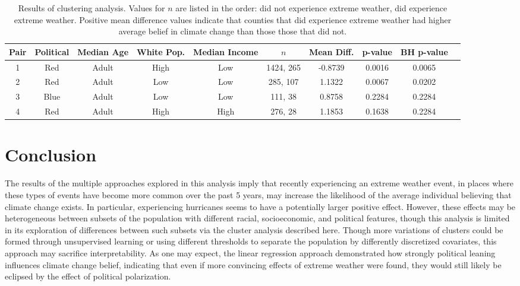 \documentclass{article}
\begin{document}
\begin{center}
\begin{table}
\begin{tabular}{| c | c | c | c | c | c | c | c | c | c ||}
\hline
Pair & Political & Median Age & White Pop. & Median Income & $n$ & Mean Diff. & p-value & BH p-value \\ [0.5ex]
\hline
\hline
1 & Red & Adult & High & Low & 1424, 265 & -0.8739 & 0.0016 & 0.0065 \\
\hline
2 & Red & Adult & Low & Low & 285, 107 & 1.1322 & 0.0067 & 0.0202 \\
\hline
3 & Blue & Adult & Low & Low & 111, 38 & 0.8758 & 0.2284 & 0.2284 \\
\hline
4 & Red & Adult & High & High & 276, 28 & 1.1853 & 0.1638 & 0.2284 \\
\hline
\end{tabular}
\caption{Results of clustering analysis. Values for $n$ are listed in the order: did not experience extreme weather, did experience extreme weather. Positive mean difference values indicate that counties that did experience extreme weather had higher average belief in climate change than those those that did not.}
\end{table}
\end{center}


\section{Conclusion}
The results of the multiple approaches explored in this analysis imply that recently experiencing an extreme weather event, in places where these types of events have become more common over the past 5 years, may increase the likelihood of the average individual believing that climate change exists. In particular, experiencing hurricanes seems to have a potentially larger positive effect. However, these effects may be heterogeneous between subsets of the population with different racial, socioeconomic, and political features, though this analysis is limited in its exploration of differences between such subsets via the cluster analysis described here. Though more variations of clusters could be formed through unsupervised learning or using different thresholds to separate the population by differently discretized covariates, this approach may sacrifice interpretability. As one may expect, the linear regression approach demonstrated how strongly political leaning influences climate change belief, indicating that even if more convincing effects of extreme weather were found, they would still likely be eclipsed by the effect of political polarization. 
\end{document}
